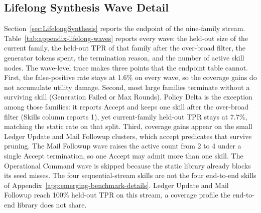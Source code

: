 \subsection{Lifelong Synthesis Wave Detail}
\label{app:lifelong-detail}



Section~\ref{sec:LifelongSynthesis} reports the endpoint of the
nine-family stream.
Table~\ref{tab:appendix-lifelong-waves} reports every wave: the held-out
size of the current family, the held-out TPR of that family after the
over-broad filter, the generator tokens spent, the termination reason,
and the number of active skill nodes.
The wave-level trace makes three points that the endpoint table cannot.
First, the false-positive rate stays at 1.6\% on every wave, so the
coverage gains do not accumulate utility damage.
Second, most large families terminate without a surviving skill
(Generation Failed or Max Rounds). Policy Delta is the exception among
those families: it reports Accept and keeps one skill after the
over-broad filter (Skills column reports 1), yet current-family held-out TPR stays
at 7.7\%, matching the static rate on that split.
Third, coverage gains appear on the small Ledger Update and Mail Followup
clusters, which accept predicates that survive pruning. The Mail Followup
wave raises the active count from 2 to 4 under a single Accept
termination, so one Accept may admit more than one skill.
The Operational Command wave is skipped because the static library already
blocks its seed misses.
The four sequential-stream skills are not the four end-to-end skills of
Appendix~\ref{app:emerging-benchmark-details}. Ledger Update and Mail
Followup reach 100\% held-out TPR on this stream, a coverage profile the
end-to-end library does not share.
